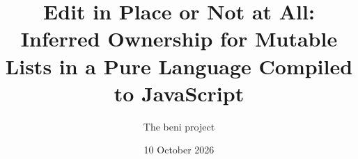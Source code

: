 \documentclass[10pt,a4paper]{article}
\title{Edit in Place or Not at All:\\[0.3em]
\large Inferred Ownership for Mutable Lists in a Pure Language Compiled to JavaScript}
\author{The beni project}
\date{10 October 2026}
\theoremstyle{definition}
\begin{document}
\maketitle

\begin{abstract}

\end{abstract}

















\appendix

\end{document}
